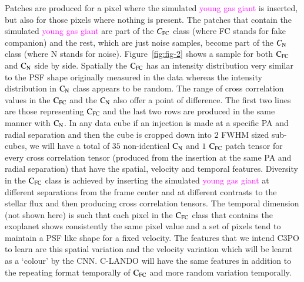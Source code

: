 \documentclass[referee]{aa} %
\newcommand{\newchange}[1]{\textcolor{magenta}{#1}}
\begin{document}
Patches are produced for a pixel where the simulated \newchange{young gas giant} is inserted, but also for those pixels where nothing is present.
The patches that contain the simulated \newchange{young gas giant} are part of the $C_{\rm{FC}}$ class (where FC stands for fake companion) and the rest, which are just noise samples, become part of the $C_{\rm{N}}$ class (where N stands for noise).
Figure~\ref{fig:fig-2} shows a sample for both $\rm{C_{FC}}$ and $\rm{C_N}$ side by side.
Spatially the $\rm{C_{FC}}$ has an intensity distribution very similar to the PSF shape originally measured in the data whereas the intensity distribution in $\rm{C_N}$ class appears to be random.
The range of cross correlation values in the $\rm{C_{FC}}$ and the $\rm{C_N}$ also offer a point of difference.
The first two lines are those representing $\rm{C_{FC}}$ and the last two rows are produced in the same manner with $\rm{C_N}$.
In any data cube if an injection is made at a specific PA and radial separation and then the cube is cropped down into $2$ FWHM sized sub-cubes, we will have a total of $35$ non-identical $\rm{C_N}$ and $1$ $\rm{C_{FC}}$ patch tensor for every cross correlation tensor (produced from the insertion at the same PA and radial separation) that have the spatial, velocity and temporal features. 
Diversity in the $\rm{C_{FC}}$ class is achieved by inserting the simulated \newchange{young gas giant} at different separations from the frame center and at different contrasts to the stellar flux and then producing cross correlation tensors.
The temporal dimension (not shown here) is such that each pixel in the $\rm{C_{FC}}$ class that contains the exoplanet shows consistently the same pixel value and a set of pixels tend to maintain a PSF like shape for a fixed velocity. 
The features that we intend C3PO to learn are this spatial variation and the velocity variation which will be learnt as a `colour' by the CNN. 
C-LANDO will have the same features in addition to the repeating format temporally of $\rm{C_{FC}}$ and more random variation temporally.
\end{document}
